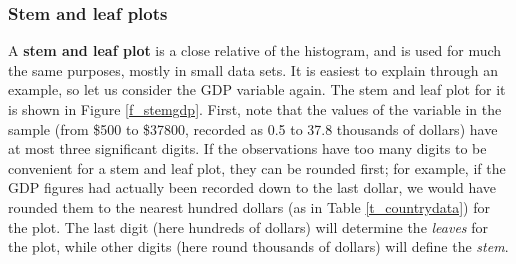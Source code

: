\subsubsection{Stem and leaf plots}
\vspace*{-1ex}
A \textbf{stem and leaf plot} is a close relative of the histogram,
and is used for much the same purposes, mostly in small data sets. It
is easiest to explain through an example, so let us consider the GDP
variable again. The stem and leaf plot for it is shown in Figure
\ref{f_stemgdp}. First, note that the values of the variable in the
sample (from \$500 to \$37800, recorded as 0.5 to 37.8 thousands of
dollars) have at most three significant digits. If the
observations have too many digits to be convenient for a stem and leaf
plot, they can be rounded first; for example, if the GDP figures had
actually been recorded down to the last dollar, we would have rounded
them to the nearest hundred dollars (as in Table \ref{t_countrydata})
for the plot. The last digit (here hundreds of dollars) will determine
the \emph{leaves} for the plot, while other digits (here round
thousands of dollars) will define the \emph{stem}.


